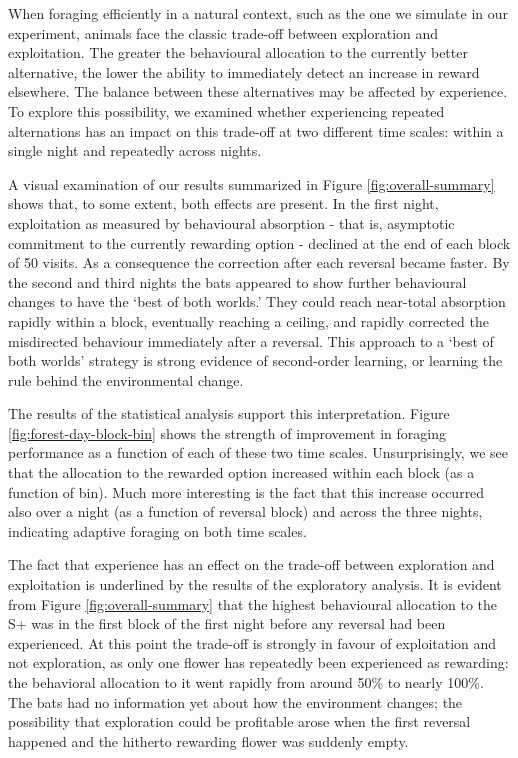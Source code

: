 \documentclass[
]{article}
\begin{document}
When foraging efficiently in a natural context, such as the one we simulate in our experiment, animals face the classic trade-off between exploration and exploitation. The greater the behavioural allocation to the currently better alternative, the lower the ability to immediately detect an increase in reward elsewhere. The balance between these alternatives may be affected by experience. To explore this possibility, we examined whether experiencing repeated alternations has an impact on this trade-off at two different time scales: within a single night and repeatedly across nights.

A visual examination of our results summarized in Figure \ref{fig:overall-summary} shows that, to some extent, both effects are present. In the first night, exploitation as measured by behavioural absorption - that is, asymptotic commitment to the currently rewarding option - declined at the end of each block of 50 visits. As a consequence the correction after each reversal became faster. By the second and third nights the bats appeared to show further behavioural changes to have the `best of both worlds.' They could reach near-total absorption rapidly within a block, eventually reaching a ceiling, and rapidly corrected the misdirected behaviour immediately after a reversal. This approach to a `best of both worlds' strategy is strong evidence of second-order learning, or learning the rule behind the environmental change.

The results of the statistical analysis support this interpretation. Figure \ref{fig:forest-day-block-bin} shows the strength of improvement in foraging performance as a function of each of these two time scales. Unsurprisingly, we see that the allocation to the rewarded option increased within each block (as a function of bin). Much more interesting is the fact that this increase occurred also over a night (as a function of reversal block) and across the three nights, indicating adaptive foraging on both time scales.

The fact that experience has an effect on the trade-off between exploration and exploitation is underlined by the results of the exploratory analysis. It is evident from Figure \ref{fig:overall-summary} that the highest behavioural allocation to the S+ was in the first block of the first night before any reversal had been experienced. At this point the trade-off is strongly in favour of exploitation and not exploration, as only one flower has repeatedly been experienced as rewarding: the behavioral allocation to it went rapidly from around 50\% to nearly 100\%. The bats had no information yet about how the environment changes; the possibility that exploration could be profitable arose when the first reversal happened and the hitherto rewarding flower was suddenly empty.
\end{document}
